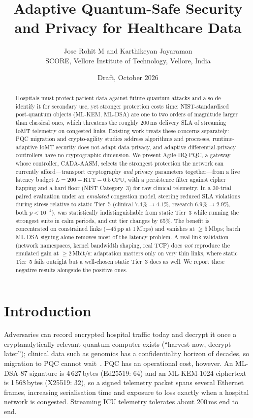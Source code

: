 \documentclass[10pt,twocolumn]{article}
\title{Adaptive Quantum-Safe Security and Privacy for Healthcare Data}
\author{Jose Rohit M and Karthikeyan Jayaraman\\ SCORE, Vellore Institute of Technology, Vellore, India}
\date{Draft, October 2026}
\begin{document}
\maketitle

\begin{abstract}
Hospitals must protect patient data against future quantum attacks and also de-identify it for secondary use, yet stronger protection costs time: NIST-standardised post-quantum objects (ML-KEM, ML-DSA) are one to two orders of magnitude larger than classical ones, which threatens the roughly 200\,ms delivery SLA of streaming IoMT telemetry on congested links. Existing work treats these concerns separately: PQC migration and crypto-agility studies address algorithms and processes, runtime-adaptive IoMT security does not adapt data privacy, and adaptive differential-privacy controllers have no cryptographic dimension. We present Agile-HQ-PQC, a gateway whose controller, CADA-AASM, selects the strongest protection the network can currently afford---transport cryptography \emph{and} privacy parameters together---from a live latency budget $L=200-\mathrm{RTT}-0.5\,\mathrm{CPU}$, with a persistence filter against cipher flapping and a hard floor (NIST Category~3) for raw clinical telemetry. In a 30-trial paired evaluation under an \emph{emulated} congestion model, steering reduced SLA violations during stress relative to static Tier~5 (clinical $7.4\%\to4.1\%$, research $6.9\%\to2.9\%$, both $p<10^{-4}$), was statistically indistinguishable from static Tier~3 while running the strongest suite in calm periods, and cut tier changes by $65\%$. The benefit is concentrated on constrained links ($-45$\,pp at 1\,Mbps) and vanishes at $\ge5$\,Mbps; batch ML-DSA signing alone removes most of the latency problem. A real-link validation (network namespaces, kernel bandwidth shaping, real TCP) does \emph{not} reproduce the emulated gain at $\ge2$\,Mbit/s: adaptation matters only on very thin links, where static Tier~5 fails outright but a well-chosen static Tier~3 does as well. We report these negative results alongside the positive ones.
\end{abstract}

\section{Introduction}
Adversaries can record encrypted hospital traffic today and decrypt it once a cryptanalytically relevant quantum computer exists (``harvest now, decrypt later''); clinical data such as genomics has a confidentiality horizon of decades, so migration to PQC cannot wait~\cite{fips203,fips204}. PQC has an operational cost, however. An ML-DSA-87 signature is 4\,627\,bytes (Ed25519: 64) and an ML-KEM-1024 ciphertext is 1\,568\,bytes (X25519: 32), so a signed telemetry packet spans several Ethernet frames, increasing serialisation time and exposure to loss exactly when a hospital network is congested. Streaming ICU telemetry tolerates about 200\,ms end to end.
\end{document}
